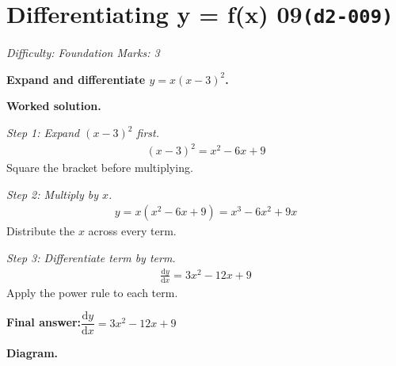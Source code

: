 \documentclass[11pt]{article}
\newcommand{\question}[1]{\par\medskip\noindent\textbf{#1}\par}
\begin{document}
\section*{Differentiating y = f(x) 09\quad\small\texttt{(d2-009)}}
\textit{Difficulty: Foundation \quad\textbar\quad Marks: 3}

\question{Expand and differentiate \( y = x(x - 3)^2 \).}

\textbf{Worked solution.}

\textit{Step 1: Expand \( (x-3)^2 \) first.}
\[\begin{gathered}
(x-3)^2 = x^2 - 6x + 9
\end{gathered}\]
Square the bracket before multiplying.

\textit{Step 2: Multiply by \( x \).}
\[\begin{gathered}
y = x(x^2 - 6x + 9) = x^3 - 6x^2 + 9x
\end{gathered}\]
Distribute the \( x \) across every term.

\textit{Step 3: Differentiate term by term.}
\[\begin{gathered}
\frac{\mathrm{d}y}{\mathrm{d}x} = 3x^2 - 12x + 9
\end{gathered}\]
Apply the power rule to each term.

\begin{answerbox}
\textbf{Final answer:}\quad \(\displaystyle  \dfrac{\mathrm{d}y}{\mathrm{d}x} = 3x^2 - 12x + 9 \)
\end{answerbox}
\textbf{Diagram.}
\end{document}
